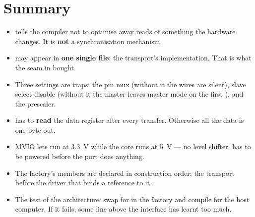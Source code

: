 \section*{Summary}

\begin{itemize}
  \item {} tells the compiler not to optimise away reads of something the hardware
    changes. It is \textbf{not} a synchronisation mechanism.
  \item {} may appear in \textbf{one single file}: the transport's implementation.
    That is what the seam in  bought.
  \item Three settings are traps: the pin mux (without it the wires are silent), slave select
    disable (without it the master leaves master mode on the first ), and the
    prescaler.
  \item {} has to \textbf{read} the data register after every transfer. Otherwise
    all the data is one byte out.
  \item MVIO lets  run at 3.3~V while the core runs at 5~V --- no level shifter.
     has to be powered before the port does anything.
  \item The factory's members are declared in construction order: the transport before the driver
    that binds a reference to it.
  \item The test of the architecture: swap  for  in the factory and compile
    for the host computer. If it fails, some line above the interface has learnt too much.
\end{itemize}
